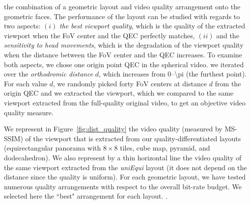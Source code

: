  the
combination of a geometric layout and video quality arrangement onto
the geometric faces. The performance of the layout can be studied with
regards to two aspects: $(i)$ \emph{the best viewport quality}, which
is the quality of the extracted viewport when the \ac{FoV} center and
the \ac{QEC} perfectly matches, $(ii)$ and the \emph{sensitivity to
head movements}, which is the degradation of the viewport quality when
the distance between the FoV center and the \ac{QEC} increases. To
examine both aspects, we chose one origin point \ac{QEC} in the
spherical video.  we iterated over the \emph{orthodromic
distance} $d$, which increases from \numrange{0}{\pi} (the furthest
point). For each value $d$, we randomly picked forty \ac{FoV} centers
at distance $d$ from the origin \ac{QEC} and we extracted the
viewport, which we compared to the same viewport extracted from the
full-quality original video, to get an objective video quality
measure.



We represent in Figure~\ref{fig:dist_quality} the video quality
(measured by \acs{MS-SSIM}) of the viewport that is extracted from our
quality-differentiated layouts (equirectangular panorama with
$8\!\times\! 8$ tiles, cube map, pyramid, and dodecahedron). We also
represent by a thin horizontal line the video quality of the same
viewport extracted from the \textit{uniEqui} layout (it does
not depend on the distance since the quality is uniform). For each
geometric layout, we have tested numerous quality arrangements with
respect to the overall bit-rate budget. We selected here the ``best"
arrangement for each layout. .

